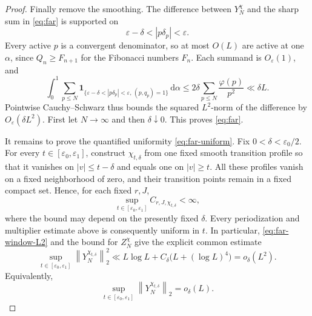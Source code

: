 \documentclass[11pt]{article}
\numberwithin{equation}{section}
\theoremstyle{definition}
\newcommand{\1}{\mathbf 1}
\newcommand{\dd}{\,\mathrm d}
\newcommand{\norm}[1]{\left\lVert#1\right\rVert}
\begin{document}
\begin{proof}
Finally remove the smoothing.  The difference between \(Y_N^\chi\)
and the sharp sum in \eqref{eq:far} is supported on
\[
 \varepsilon-\delta<|p\delta_p|<\varepsilon.
\]
Every active \(p\) is a convergent denominator, so at most \(O(L)\)
are active at one \(\alpha\), since \(Q_n\ge F_{n+1}\) for the Fibonacci
numbers \(F_n\).  Each summand is \(O_\varepsilon(1)\), and
\[
 \int_0^1\sum_{p\le N}
 \1_{\{\varepsilon-\delta<|p\delta_p|<\varepsilon,\,
       (p,q_p)=1\}}\dd\alpha
 \le2\delta\sum_{p\le N}\frac{\varphi(p)}{p^2}
 \ll\delta L.
\]
Pointwise Cauchy--Schwarz thus bounds the squared \(L^2\)-norm of the
difference by \(O_\varepsilon(\delta L^2)\).  First let \(N\to\infty\)
and then \(\delta\downarrow0\).  This proves \eqref{eq:far}.

It remains to prove the quantified uniformity
\eqref{eq:far-uniform}.  Fix
\(0<\delta<\varepsilon_0/2\).  For every
\(t\in[\varepsilon_0,\varepsilon_1]\), construct
\(\chi_{t,\delta}\) from one fixed smooth transition profile so that it
vanishes on \(|v|\le t-\delta\) and equals one on \(|v|\ge t\).
All these profiles vanish on a fixed neighborhood of zero, and their
transition points remain in a fixed compact set.  Hence, for each fixed
\(r,J\),
\begin{equation}\label{eq:uniform-chi-seminorms}
 \sup_{t\in[\varepsilon_0,\varepsilon_1]}
 C_{r,J,\chi_{t,\delta}}<\infty,
\end{equation}
where the bound may depend on the presently fixed \(\delta\).  Every
periodization and multiplier estimate above is consequently uniform in
\(t\).  In particular, \eqref{eq:far-window-L2} and the bound for
\(Z_N^\chi\) give the explicit common estimate
\[
 \sup_{t\in[\varepsilon_0,\varepsilon_1]}
 \norm{Y_N^{\chi_{t,\delta}}}_2^2
 \ll L\log L+C_\delta\bigl(L+(\log L)^4\bigr)=o_\delta(L^2).
\]
Equivalently,
\begin{equation}\label{eq:uniform-smoothed-far}
 \sup_{t\in[\varepsilon_0,\varepsilon_1]}
 \norm{Y_N^{\chi_{t,\delta}}}_2=o_\delta(L).
\end{equation}


\end{proof}
\end{document}
